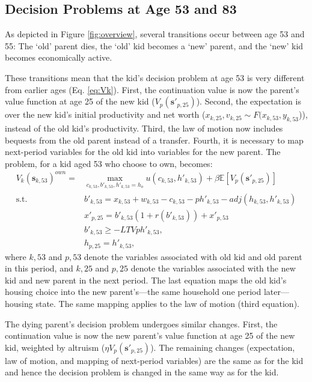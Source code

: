 \documentclass[12pt]{article}
\newcommand{\E}{\mathbb{E}}
\begin{document}
\subsection{Decision Problems at Age 53 and 83}\label{sec:decextra}
As depicted in Figure \ref{fig:overview}, several transitions occur between age 53 and 55: The `old' parent dies, the `old' kid becomes a `new' parent, and the `new' kid becomes economically active. 

These transitions mean that the kid's decision problem at age 53 is very different from earlier ages (Eq. \ref{eq:Vk}). First, the continuation value is now the parent's value function at age 25 of the new kid ($V_{p}({\mathbf{s}'_{p,25}})$). Second, the expectation is over the new kid's initial productivity and net worth ($x_{k,25},v_{k,25}\sim F(x_{k,53},y_{k,53}$)), instead of the old kid's productivity. Third, the law of motion now includes bequests from the old parent instead of a transfer. Fourth, it is necessary to map next-period variables for the old kid into variables for the new parent. The problem, for a kid aged 53 who choose to own, becomes:
\begin{equation*}
\begin{split}
V_k(\mathbf{s}_{k,53})^{own} = &\max_{c_{k,53},b'_{k,53},h'_{k,53}=h_o}  u(c_{k,53},h'_{k,53}) + \beta \E\left[V_{p}({\mathbf{s}'_{p,25}}) \right] \\
\text{s.t.}\quad & 	b'_{k,53} = x_{k,53} + w_{k,53} - c_{k,53} - p h'_{k,53} - adj(h_{k,53},h'_{k,53}) \\
& x'_{p,25} = b'_{k,53}(1+r(b'_{k,53})) + x'_{p,53} \\
& b'_{k,53} \ge -LTV p h'_{k,53}, \\
& h_{p,25} = h'_{k,53},
\end{split}
\end{equation*} 
where $k,53$ and $p,53$ denote the variables associated with old kid and old parent in this period, and $k,25$ and $p,25$ denote the variables associated with the new kid and new parent in the next period. The last equation maps the old kid's housing choice into the new parent's---the same household one period later---housing state. The same mapping applies to the law of motion (third equation).

The dying parent's decision problem undergoes similar changes. First, the continuation value is now the new parent's value function at age 25 of the new kid, weighted by altruism ($\eta V_p(\mathbf{s}'_{p,25})$). The remaining changes (expectation, law of motion, and mapping of next-period variables) are the same as for the kid and hence the decision problem is changed in the same way as for the kid.
\end{document}
